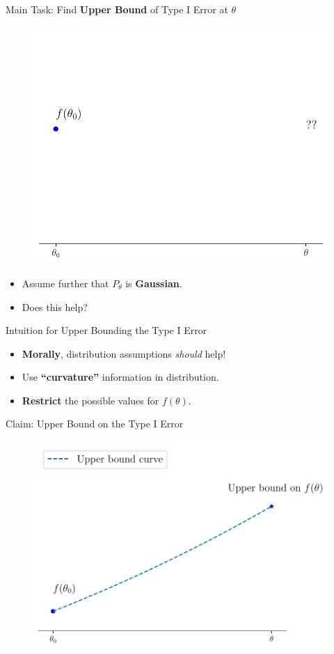 \begin{frame}{Main Task: Find \textbf{Upper Bound} of Type I Error at $\theta$}
\begin{figure}
    \centering
    \includegraphics[width=0.75\linewidth]{figs/cse_problem.pdf}
\end{figure}
\begin{itemize}
    \item Assume further that $P_\theta$ is \textbf{Gaussian}.
    \item Does this help?
\end{itemize}
\end{frame}

\begin{frame}{Intuition for Upper Bounding the Type I Error}
\begin{itemize}
    \item \textbf{Morally}, distribution assumptions \emph{should} help!
    \item Use \textbf{``curvature''} information in distribution.
    \item \textbf{Restrict} the possible values for $f(\theta)$.
\end{itemize} 
\end{frame}

\begin{frame}{Claim: Upper Bound on the Type I Error}
\begin{figure}
    \centering
    \includegraphics[width=\linewidth]{figs/cse_solution.pdf}
\end{figure} 
\end{frame}


